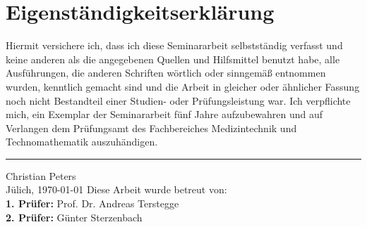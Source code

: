 \chapter*{Eigenständigkeitserklärung}
\thispagestyle{empty}
Hiermit versichere ich, dass ich diese Seminararbeit selbstst\"andig verfasst
und keine anderen als die angegebenen Quellen und Hilfsmittel benutzt habe,
alle Ausf\"uhrungen, die anderen Schriften w\"ortlich oder sinngem\"a{\ss} 
entnommen wurden, kenntlich gemacht sind und die Arbeit in gleicher oder
\"ahnlicher Fassung noch nicht Bestandteil einer Studien- oder
Pr\"ufungsleistung war. Ich verpflichte mich, ein Exemplar der Seminararbeit
f\"unf Jahre aufzubewahren und auf Verlangen dem Pr\"ufungsamt des
Fachbereiches Medizintechnik und Technomathematik auszuh\"andigen.
\vspace{1.5cm}
{\hrule width 6cm} 
\vspace{1ex}
\noindent{}Christian Peters\\
Jülich, \today
\vfill
\noindent{}Diese Arbeit wurde betreut von:\\
{\bfseries 1. Prüfer:} Prof. Dr. Andreas Terstegge\\
{\bfseries 2. Prüfer:} G\"unter Sterzenbach
